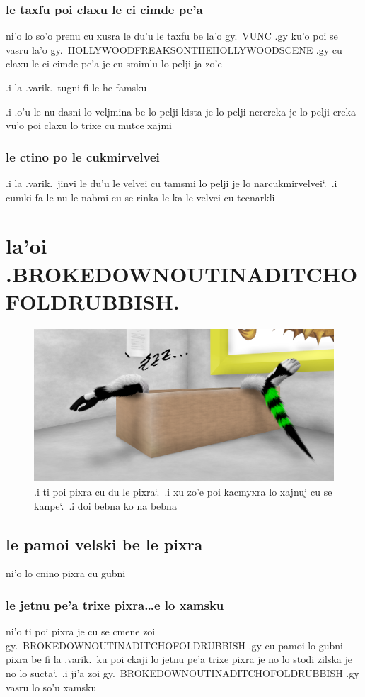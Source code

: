 \documentclass{report}
\newcommand\sds{\spacefactor\sfcode`.\ \space}
\begin{document}
\subsection{le taxfu poi claxu le ci cimde pe'a}
ni'o lo so'o prenu cu xusra le du'u le taxfu be la'o gy.\ VUNC .gy ku'o poi se vasru la'o gy.\ HOLLYWOODFREAKSONTHEHOLLYWOODSCENE .gy cu claxu le ci cimde pe'a je cu smimlu lo pelji ja zo'e

.i la .varik.\ tugni fi le he famsku

.i .o'u le nu dasni lo veljmina be lo pelji kista je lo pelji nercreka je lo pelji creka vu'o poi claxu lo trixe cu mutce xajmi

\subsection{le ctino po le cukmirvelvei}
.i la .varik.\ jinvi le du'u le velvei cu tamsmi lo pelji je lo narcukmirvelvei\sds  .i cumki fa le nu le nabmi cu se rinka le ka le velvei cu tcenarkli

\chapter{la'oi .BROKEDOWNOUTINADITCHOFOLDRUBBISH.}
\begin{figure}[ht]
	\centering
	\includegraphics[width=\textwidth]{brokedownoutinaditchofoldrubbish/brokedownoutinaditchofoldrubbish.png}
	\caption[center]{.i ti poi pixra cu du le pixra\sds  .i xu zo'e poi kacmyxra lo xajnuj cu se kanpe\sds  .i doi bebna ko na bebna}
\end{figure}
\section{le pamoi velski be le pixra}
ni'o lo cnino pixra cu gubni

\subsection{le jetnu pe'a trixe pixra\ldots e lo xamsku}
ni'o ti poi pixra je cu se cmene zoi gy.\ BROKEDOWNOUTINADITCHOFOLDRUBBISH .gy cu pamoi lo gubni pixra be fi la .varik.\ ku poi ckaji lo jetnu pe'a trixe pixra je no lo stodi zilska je no lo sucta\sds  .i ji'a zoi gy.\ BROKEDOWNOUTINADITCHOFOLDRUBBISH .gy vasru lo so'u xamsku
\end{document}
